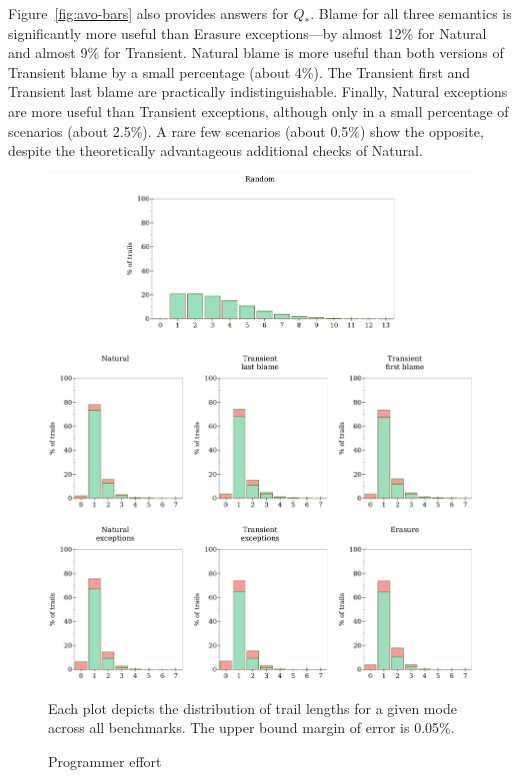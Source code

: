 Figure~\ref{fig:avo-bars} also provides answers for $Q_*$. Blame for all three
semantics is significantly more useful than Erasure exceptions---by almost
12\% for Natural and almost 9\% for Transient. Natural blame is more useful than
both versions of Transient blame by a small percentage (about 4\%). The
Transient first and Transient last blame are practically indistinguishable.
Finally, Natural exceptions are more useful than Transient exceptions, although
only in a small percentage of scenarios (about 2.5\%). A rare few scenarios
(about 0.5\%) show the opposite, despite the theoretically advantageous
additional checks of Natural.

\begin{figure} \footnotesize \centering
  \includegraphics[width=\textwidth]{./plots/bt-lengths-table}

  \vspace{1em}
  \begin{minipage}{0.95\textwidth}
    Each plot depicts the distribution of trail lengths for a given mode across all benchmarks.
    The upper bound margin of error is 0.05\%.
  \end{minipage}

  \caption{Programmer effort} \label{fig:effort-table}
\end{figure}

